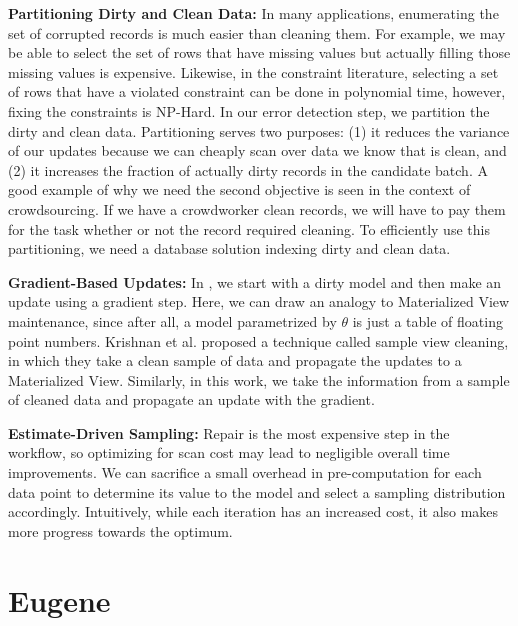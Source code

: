 \vspace{0.5em}

\noindent\textbf{Partitioning Dirty and Clean Data: } In many applications, enumerating the set of corrupted records is much easier than cleaning them. For example, we may be able to select the set of rows that have missing values but actually filling those missing values is expensive. Likewise, in the constraint literature, selecting a set of rows that have a violated constraint can be done in polynomial time, however, fixing the constraints is NP-Hard.
In our error detection step, we partition the dirty and clean data.
Partitioning serves two purposes: (1) it reduces the variance of our updates because we can cheaply scan over data we know that is clean, and (2) it increases the fraction of actually dirty records in the candidate batch.
A good example of why we need the second objective is seen in the context of crowdsourcing.
If we have a crowdworker clean records, we will have to pay them for the task whether or not the record required cleaning.
To efficiently use this partitioning, we need a database solution indexing dirty and clean data.

\vspace{0.5em}

\noindent\textbf{Gradient-Based Updates: } In \sys, we start with a dirty model and then make an update using a gradient step. Here, we can draw an analogy to Materialized View maintenance, since after all, a model parametrized by $\theta$ is just a table of floating point numbers.
Krishnan et al. proposed a technique called sample view cleaning, in which they take a clean sample of data and propagate the updates to a Materialized View.
Similarly, in this work, we take the information from a sample of cleaned data and propagate an update with the gradient.

\vspace{0.5em}

\noindent\textbf{Estimate-Driven Sampling: } Repair is the most expensive step in the workflow, so optimizing for scan cost may lead to negligible overall time improvements.
We can sacrifice a small overhead in pre-computation for each data point to determine its value to the model and select a sampling distribution accordingly.
Intuitively, while each iteration has an increased cost, it also makes more progress towards the optimum.
\fi





\section{Eugene}

